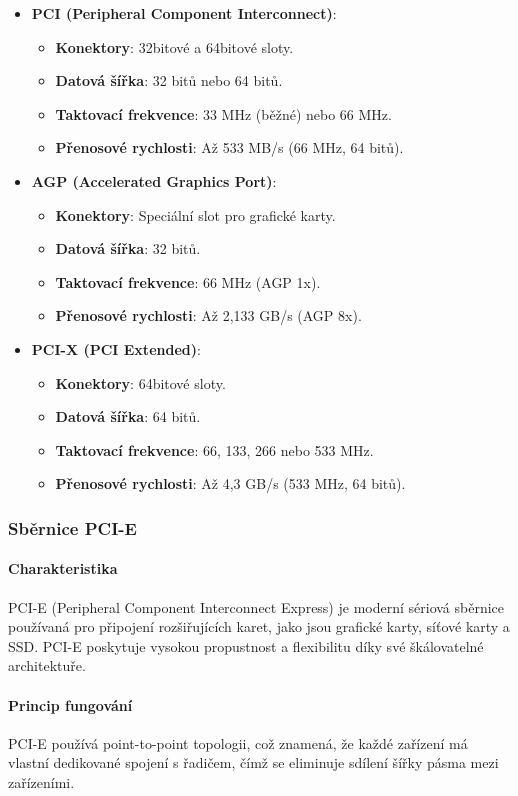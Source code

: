 \begin{itemize}
\item \textbf{PCI (Peripheral Component Interconnect)}:
\begin{itemize}
\item \textbf{Konektory}: 32bitové a 64bitové sloty.
\item \textbf{Datová šířka}: 32 bitů nebo 64 bitů.
\item \textbf{Taktovací frekvence}: 33 MHz (běžné) nebo 66 MHz.
\item \textbf{Přenosové rychlosti}: Až 533 MB/s (66 MHz, 64 bitů).
\end{itemize}
\item \textbf{AGP (Accelerated Graphics Port)}:
\begin{itemize}
\item \textbf{Konektory}: Speciální slot pro grafické karty.
\item \textbf{Datová šířka}: 32 bitů.
\item \textbf{Taktovací frekvence}: 66 MHz (AGP 1x).
\item \textbf{Přenosové rychlosti}: Až 2,133 GB/s (AGP 8x).
\end{itemize}
\item \textbf{PCI-X (PCI Extended)}:
\begin{itemize}
\item \textbf{Konektory}: 64bitové sloty.
\item \textbf{Datová šířka}: 64 bitů.
\item \textbf{Taktovací frekvence}: 66, 133, 266 nebo 533 MHz.
\item \textbf{Přenosové rychlosti}: Až 4,3 GB/s (533 MHz, 64 bitů).
\end{itemize}
\end{itemize}

\subsubsection{Sběrnice PCI-E}

\paragraph{Charakteristika}
PCI-E (Peripheral Component Interconnect Express) je moderní sériová sběrnice používaná pro připojení rozšiřujících karet, jako jsou grafické karty, síťové karty a SSD. PCI-E poskytuje vysokou propustnost a flexibilitu díky své škálovatelné architektuře.

\paragraph{Princip fungování}
PCI-E používá point-to-point topologii, což znamená, že každé zařízení má vlastní dedikované spojení s řadičem, čímž se eliminuje sdílení šířky pásma mezi zařízeními.

